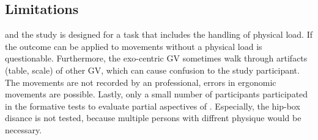\subsection{Limitations}
\label{sec:limitations}
\exgo and the study is designed for a task that includes the handling of physical load. If the outcome can be applied to movements without a physical load is questionable. Furthermore, the exo-centric GV sometimes walk through artifacts (table, scale) of other GV, which can cause confusion to the study participant. The movements are not recorded by an professional, errors in ergonomic movements are possible. Lastly, only a small number of participants participated in the formative tests to evaluate partial aspectives of \exgo. Especially, the hip-box disance is not tested, because multiple persons with diffrent physique would be necessary.
